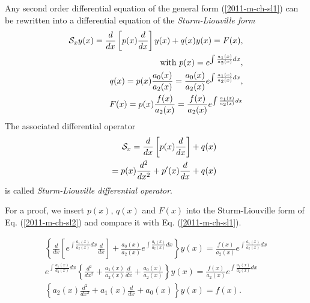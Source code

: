 Any second order differential equation of the general form (\ref{2011-m-ch-sl1})
can be rewritten into a differential equation of the {\em Sturm-Liouville form}
\begin{equation}
\begin{split}
{\cal S}_{x} y(x) =
\frac{d}{dx}
\left[
p(x)
\frac{d}{dx}
\right]  y(x)
+
q(x) y(x)
=
F(x), \\ \qquad
\textrm{with }  p(x)=e^{\int \frac{a_1(x)}{a_2(x)} dx},\\  \qquad
q(x)=p(x) \frac{a_0(x)}{a_2(x)}=  \frac{a_0(x)}{a_2(x)}e^{\int \frac{a_1(x)}{a_2(x)} dx},\\   \qquad
F(x)=p(x) \frac{f(x)}{a_2(x)}= \frac{f(x)}{a_2(x)} e^{\int \frac{a_1(x)}{a_2(x)} dx}
\end{split}
\label{2011-m-ch-sl2}
\end{equation}
The associated differential operator
\begin{equation}
\begin{split}
{\cal S}_{x}  =
\frac{d}{dx}
\left[
p(x)
\frac{d}{dx}
\right]
+
q(x)     \\
\qquad =
p(x)\frac{d^2}{dx^2}
+
p'(x)
\frac{d}{dx}
+
q(x)
\end{split}
\label{2011-m-ch-sl3}
\end{equation}
is called
{\em Sturm-Liouville differential operator}.

{\color{OliveGreen}
\bproof
For a proof, we insert $p(x)$, $q(x)$ and $F(x)$
into the Sturm-Liouville form of Eq. (\ref{2011-m-ch-sl2}) and compare it with
Eq. (\ref{2011-m-ch-sl1}).

\begin{equation}
\begin{split}
\left\{  \frac{d}{dx}
\left[
e^{\int \frac{a_1(x)}{a_2(x)} dx}
\frac{d}{dx}
\right]
+
\frac{a_0(x)}{a_2(x)}e^{\int \frac{a_1(x)}{a_2(x)} dx} \right\} y(x)
=
\frac{f(x)}{a_2(x)}e^{\int \frac{a_1(x)}{a_2(x)} dx}\\
e^{\int \frac{a_1(x)}{a_2(x)} dx} \left\{
\frac{d^2}{dx^2} +
\frac{a_1(x)}{a_2(x)}
\frac{d}{dx}
+
\frac{a_0(x)}{a_2(x)}\right\} y(x)
=
\frac{f(x)}{a_2(x)}e^{\int \frac{a_1(x)}{a_2(x)} dx}\\
\left\{
a_2(x)\frac{d^2}{dx^2} +
a_1(x)\frac{d}{dx}
+
a_0(x)\right\} y(x)
=
f(x).
\end{split}
\label{2011-m-ch-sl21}
\end{equation}

\eproof
}


